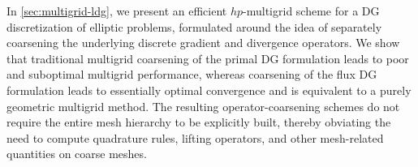 
In \cref{sec:multigrid-ldg}, we present an efficient $hp$-multigrid scheme for a DG discretization of elliptic problems, formulated around the idea of separately coarsening the underlying discrete gradient and divergence operators. We show that traditional multigrid coarsening of the primal DG formulation leads to poor and suboptimal multigrid performance, whereas coarsening of the flux DG formulation leads to essentially optimal convergence and is equivalent to a purely geometric multigrid method. The resulting operator-coarsening schemes do not require the entire mesh hierarchy
to be explicitly built, thereby obviating the need to compute quadrature rules, lifting operators,
and other mesh-related quantities on coarse meshes. 




